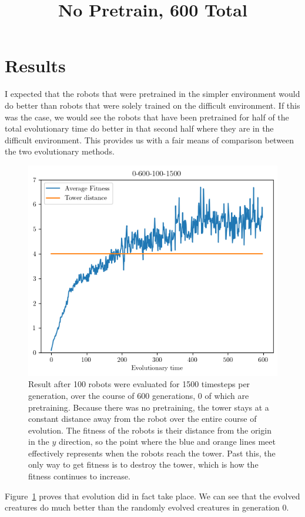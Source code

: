 \documentclass[12pt, a4paper]{article}
\begin{document}
\section{Results}
I expected that the robots that were pretrained in the simpler environment would do better than robots that were solely trained on the difficult environment. If this was the case, we would see the robots that have been pretrained for half of the total evolutionary time do better in that second half where they are in the difficult environment. This provides us with a fair means of comparison between the two evolutionary methods. 
\begin{figure}[h]
	\centering
	\title{No Pretrain, 600 Total}
	\includegraphics[width=1\textwidth]{0-600-100-1500/0-600-100-1500.png}
	\caption{Result after 100 robots were evaluated for 1500 timesteps per generation, over the course of 600 generations, 0 of which are pretraining. Because there was no pretraining, the tower stays at a constant distance away from the robot over the entire course of evolution. The fitness of the robots is their distance from the origin in the $y$ direction, so the point where the blue and orange lines meet effectively represents when the robots reach the tower. Past this, the only way to get fitness is to destroy the tower, which is how the fitness continues to increase.}
	\label{nopretrain}
\end{figure}

Figure~\ref{nopretrain} proves that evolution did in fact take place. We can see that the evolved creatures do much better than the randomly evolved creatures in generation 0.
\end{document}
